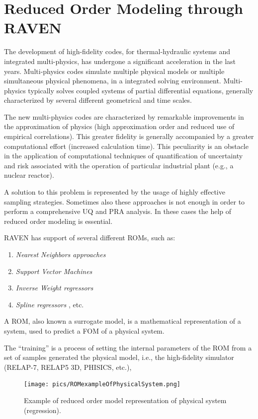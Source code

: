 \section{Reduced Order Modeling through RAVEN}
\label{sec:ROMraven}
The development of high-fidelity codes, for thermal-hydraulic systems
and integrated multi-physics, has undergone a significant acceleration
in the last years. Multi-physics codes simulate
multiple physical models or multiple simultaneous physical phenomena,
in a integrated solving environment. Multi-physics typically
solves coupled systems of partial differential equations, generally
characterized by several different geometrical and time scales.

The new multi-physics codes are characterized by remarkable
improvements
in the approximation of physics (high approximation order and reduced
use of empirical correlations). This greater fidelity is generally
accompanied by a greater computational effort (increased calculation time). This peculiarity is an
obstacle in the application of  computational techniques of
quantification of uncertainty and risk associated with the operation of
particular industrial plant (e.g., a nuclear reactor).

A solution to this problem is represented by the
usage
of highly effective sampling strategies. Sometimes also these
approaches is not enough
in order to perform a comprehensive UQ and PRA analysis. In these
cases the help of reduced order modeling is essential.

RAVEN has support of several different ROMs,
such as:
\begin{enumerate}
  \item \textit{Nearest Neighbors approaches}
  \item \textit{Support Vector Machines}
  \item \textit{Inverse Weight regressors}
  \item \textit{Spline regressors }, etc.
\end{enumerate}

A ROM, also known a surrogate
model, is a mathematical representation of a system, used to predict
a FOM of a physical system.

The ``training'' is a process of setting the internal parameters of the ROM from a set
of samples generated the physical model, i.e.,
 the high-fidelity simulator (RELAP-7, RELAP5
3D, PHISICS, etc.),
\begin{figure}[h!]
  \centering
  \texttt{[image: pics/ROMexampleOfPhysicalSystem.png]}
  \caption{Example of reduced order model representation of physical system (regression).}
  \label{fig:ROMexampleOfPhysicalSystem}
\end{figure}

